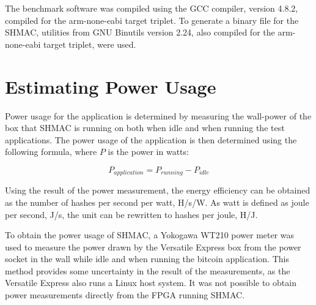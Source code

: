 The benchmark software was compiled using the GCC compiler, version 4.8.2, compiled for
the arm-none-eabi target triplet. To generate a binary file for the SHMAC, utilities
from GNU Binutils version 2.24, also compiled for the arm-none-eabi target triplet,
were used.

\section{Estimating Power Usage}
\label{sec:power-measure}

Power usage for the application is determined by measuring the wall-power of the box
that SHMAC is running on both when idle and when running the test applications. The
power usage of the application is then determined using the following formula, where
$P$ is the power in watts:

\[P_{application} = P_{running} - P_{idle}\]

Using the result of the power measurement, the energy efficiency can be obtained as
the number of hashes per second per watt, H/s/W. As watt is defined as joule per second,
J/s, the unit can be rewritten to hashes per joule, H/J.

To obtain the power usage of SHMAC, a Yokogawa WT210 power meter was used to measure
the power drawn by the Versatile Express box from the power socket in the wall while
idle and when running the bitcoin application. This method provides some uncertainty
in the result of the measurements, as the Versatile Express also runs a Linux host
system. It was not possible to obtain power measurements directly from the FPGA running
SHMAC. %

%
%
%
%
%

